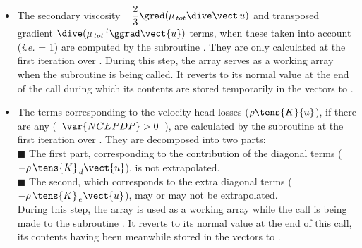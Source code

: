 \begin{itemize}
{\tiny$\blacksquare$} Turbulent viscosity models:\\
If $\var{IGRHOK}=1$, then we calculate $-\displaystyle \frac{2}{3}\ \rho\ \grad k$ (and not, as should be the case,
$-\displaystyle \frac{2}{3}\grad (\rho k)$) by way of simplification
(cf. paragraph~\ref{Base_Predvv_section4}). The gradient of the turbulent kinetic energy $k$ is computed on the cell by the subroutine . \\
If $\var{IGRHOK}=0$, this term is expected to be implicitly taken into account in the pressure.\\
{\tiny$\blacksquare$} Second order models:\\
Computation of the term $-\dive(\rho \tens{R})$ is implemented in two steps. A call is first made to the subroutine , which projects the vector $\tens{R}.\vect{e}_{\var{DIR}}$ onto the cell faces along the direction , following which we then call the subroutine  to compute the divergence.\\
\linebreak
\item The secondary viscosity $- \displaystyle \frac {2} {3}\grad (\mu_{\,tot} \dive \vect\,{u})$ and transposed gradient $ \dive (\mu_{\,tot} \,^t\ggrad \vect {u})$ terms, when these taken into account (\emph{i.e.}  = 1) are computed by the subroutine . They are only calculated at the first iteration over . During this step, the array  serves as a working array when the subroutine   is being called. It reverts to its normal value at the end of the call during which its contents are stored temporarily in the vectors  to .
\\
\item The terms corresponding to the velocity head losses ($\rho \tens{K}
{u}$), if there are any (\ $\var{NCEPDP}> 0$\ ), are calculated by the subroutine  at the first iteration over . They are decomposed into two parts:\\
{\tiny$\blacksquare$} The first part, corresponding to the contribution of the diagonal terms ($-\rho\,\tens{K}_{\,d}\vect{u}$), is not extrapolated.\\
{\tiny$\blacksquare$} The second, which corresponds to the extra diagonal terms
($-\rho\,\tens{K}_{\,e}\vect{u}$), may or may not be extrapolated.\\
During this step, the array  is used as a working array while the call is being made to the subroutine . It reverts to its normal value at the end of this call, its contents having been meanwhile stored in the vectors  to .

\end{itemize}

